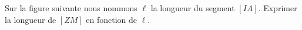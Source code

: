 
\begin{exercice}\label{exo2smath-0058}

    Sur la figure suivante nous nommons \( \ell\) la longueur du segment \( [IA]\). Exprimer la longueur de \( [ZM]\) en fonction de \( \ell\).

\begin{center}
   
\end{center}

\end{exercice}
